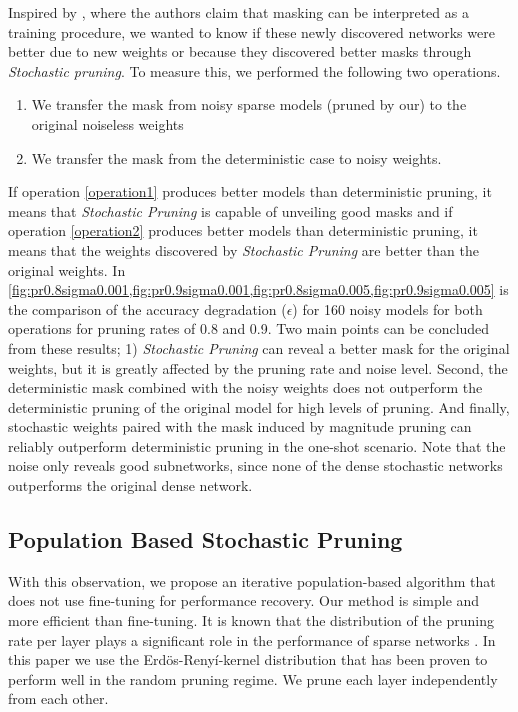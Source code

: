 Inspired by \cite{zhouDeconstructingLotteryTickets2019}, where the authors claim that masking can be interpreted as a training procedure, we wanted to know if these newly discovered networks were better due to new weights or because they discovered better masks through \textit{Stochastic pruning}.
To measure this, we performed the following two operations.
\begin{enumerate}[label={\bfseries OP\arabic*}]
    \item We transfer the mask from noisy sparse models (pruned by our) to the original noiseless weights\label{operation1}
    \item We transfer the mask from the deterministic case to noisy weights. \label{operation2}
\end{enumerate}
If operation \ref{operation1} produces better models than deterministic pruning, it means that \textit{Stochastic Pruning} is capable of unveiling good masks and if operation \ref{operation2} produces better models than deterministic pruning, it means that the weights discovered by \textit{Stochastic Pruning}
are better than the original weights. In \cref{fig:pr0.8sigma0.001,fig:pr0.9sigma0.001,fig:pr0.8sigma0.005,fig:pr0.9sigma0.005} is the comparison of the accuracy degradation ($\epsilon$) for 160 noisy models for both operations for pruning rates of 0.8 and 0.9. Two main points can be concluded from these results; 1) \textit{Stochastic Pruning} can reveal a better mask for the original weights, but it is greatly affected by the pruning rate and noise level. 
Second, the deterministic mask combined with the noisy weights does not outperform the deterministic pruning of the original model for high levels of pruning. And finally, stochastic weights paired with the mask induced by magnitude pruning can reliably outperform deterministic pruning in the one-shot scenario. Note that the noise only reveals good subnetworks, since none of the dense stochastic networks outperforms the original dense network.

\subsection{Population Based Stochastic Pruning}
With this observation, we propose an iterative population-based algorithm that does not use fine-tuning for performance recovery. Our method is simple and more efficient than fine-tuning.
It is known that the distribution of the pruning rate per layer plays a significant role in the performance of sparse networks
\cite{leeLayeradaptiveSparsityMagnitudebased2022}. In this paper we use  the Erdös-Renyí-kernel distribution \cite{evciRiggingLotteryMaking2020} that has been proven to perform well in the random pruning regime\cite{liuUnreasonableEffectivenessRandom2022}. We prune each layer independently from each other.

